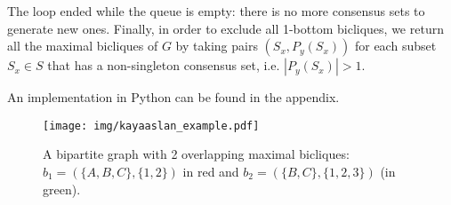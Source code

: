 \documentclass[table]{report}
\begin{document}
The loop ended while the queue is empty: there is no more consensus sets to generate new ones. Finally, in order to exclude all 1-bottom bicliques, we return all the maximal bicliques of $G$ by taking pairs $(S_x,P_y(S_x))$ for each subset $S_x \in S$ that has a non-singleton consensus set, i.e. $|P_y(S_x)| > 1$.

An implementation in Python can be found in the appendix.
\begin{figure}[h]%
\centering
\texttt{[image: img/kayaaslan\_example.pdf]}
\caption{A bipartite graph with 2 overlapping maximal bicliques: $b_1 = (\{A,B,C\}, \{1,2\})$ in red and $b_2 = (\{B,C\}, \{1,2,3\})$ (in green).}
\label{fig:kayaaslan_example}
\end{figure}
\FloatBarrier


\end{document}
